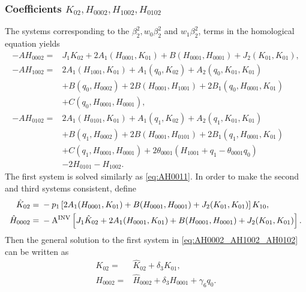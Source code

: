 \subsubsection{Coefficients
				\texorpdfstring{$K_{02},H_{0002},H_{1002},H_{0102}$}
				{H0002,K02,H1002,H0102}}

The systems corresponding to the $\beta_2^2, w_0\beta_2^2$ and $w_1\beta_2^2$,
terms in the homological equation yields
\begin{equation}
\label{eq:AH0002_AH1002_AH0102}
\begin{aligned}
-A H_{0002}={}&  J_1K_{02} + 2A_1(H_{0001},K_{01})
							 + B(H_{0001},H_{0001}) + J_2(K_{01},K_{01}), \\
-A H_{1002}={}& 2A_1(H_{1001},K_{01}) + A_1(q_0,K_{02}) + A_2(q_0,K_{01},K_{01})
					 \\ & + B(q_0,H_{0002}) + 2B(H_{0001},H_{1001}) +
					 2B_1(q_0,H_{0001},K_{01}) \\
  & + C(q_0,H_{0001},H_{0001}), \\
-A H_{0102}={}& 2A_1(H_{0101},K_{01}) + A_1(q_1,K_{02}) + A_2(q_1,K_{01},K_{01}) \\
  & + B(q_1,H_{0002}) + 2B(H_{0001},H_{0101}) + 2B_1(q_1,H_{0001},K_{01}) \\
	& + C(q_1,H_{0001},H_{0001}) +2\theta_{0001} (H_{1001} + q_1 -
	  \theta_{0001}q_0)  \\
  & - 2H_{0101} - H_{1002}.
\end{aligned}
\end{equation}
The first system is solved similarly as \cref{eq:AH0011}. In order to make the second and third systems
consistent, define
\begin{equation*}
\begin{aligned}
\hat K_{02}={}&-p_1\left[2A_1(H_{0001},K_{01})+B(H_{0001},H_{0001})
				+J_2(K_{01},K_{01})\right]K_{10}, \\
\hat H_{0002}={}& -\operatorname{A^{\text{INV}}}\left[ J_1 \hat K_{02} + 2A_1(H_{0001},K_{01})
							 + B(H_{0001},H_{0001}) + J_2(K_{01},K_{01})\right].
\end{aligned}
\end{equation*}
Then the general solution to the first system in \cref{eq:AH0002_AH1002_AH0102}
can be written as
\begin{equation*}
\begin{aligned}
				K_{02}={}& \hat K_{02} + \delta_3 K_{01}, \\
				H_{0002}={}& \hat H_{0002} +  \delta_3 H_{0001} + \gamma_6 q_0.
\end{aligned}
\end{equation*}
